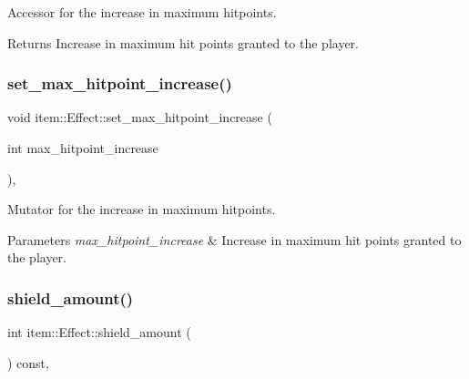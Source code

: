 Accessor for the increase in maximum hitpoints. 

\begin{DoxyReturn}{Returns}
Increase in maximum hit points granted to the player. 
\end{DoxyReturn}
\mbox{\label{classitem_1_1_effect_af2710ca17d043b8aeb3360fd991e3140}} 
\subsubsection{\texorpdfstring{set\+\_\+max\+\_\+hitpoint\+\_\+increase()}{set\_max\_hitpoint\_increase()}}
{\footnotesize\ttfamily void item\+::\+Effect\+::set\+\_\+max\+\_\+hitpoint\+\_\+increase (\begin{DoxyParamCaption}\item[{int}]{max\+\_\+hitpoint\+\_\+increase }\end{DoxyParamCaption})\hspace{0.3cm}{\ttfamily [inline]}, {\ttfamily [noexcept]}}



Mutator for the increase in maximum hitpoints. 


\begin{DoxyParams}{Parameters}
{\em max\+\_\+hitpoint\+\_\+increase} & Increase in maximum hit points granted to the player. \\
\hline
\end{DoxyParams}
\mbox{\label{classitem_1_1_effect_a9a6f54d0eab7dd13b2ef14e04f6ddb56}} 
\subsubsection{\texorpdfstring{shield\+\_\+amount()}{shield\_amount()}}
{\footnotesize\ttfamily int item\+::\+Effect\+::shield\+\_\+amount (\begin{DoxyParamCaption}{ }\end{DoxyParamCaption}) const\hspace{0.3cm}{\ttfamily [inline]}, {\ttfamily [noexcept]}}



